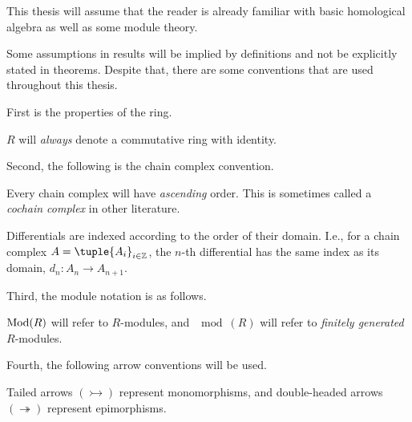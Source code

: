 This thesis will assume that the reader is already familiar with basic homological algebra as well as some module theory.

Some assumptions in results will be implied by definitions and not be explicitly stated in theorems. Despite that, there are some conventions that are used throughout this thesis.

First is the properties of the ring.
\begin{notation}
    \( R \) will \emph{always} denote a commutative ring with identity.
\end{notation}

Second, the following is the chain complex convention.
\begin{notation}
    \label{not:chain_complex}
    Every chain complex will have \emph{ascending} order. This is sometimes called a \emph{cochain complex} in other literature.

    Differentials are indexed according to the order of their domain. I.e., for a chain complex \( A = \tuple{A_i}_{i \in \Zb} \), the \( n \)-th differential has the same index as its domain, \( d_n: A_n \to A_{n + 1} \).
\end{notation}

Third, the module notation is as follows.
\begin{notation}
    \( \operatorname{Mod}(R) \) will refer to \( R \)-modules, and \( \mod(R) \) will refer to \emph{finitely generated} \( R \)-modules.
\end{notation}

Fourth, the following arrow conventions will be used.
\begin{notation}
    Tailed arrows \( (\rightarrowtail) \) represent monomorphisms, and double-headed arrows \( (\twoheadrightarrow) \) represent epimorphisms.
\end{notation}

